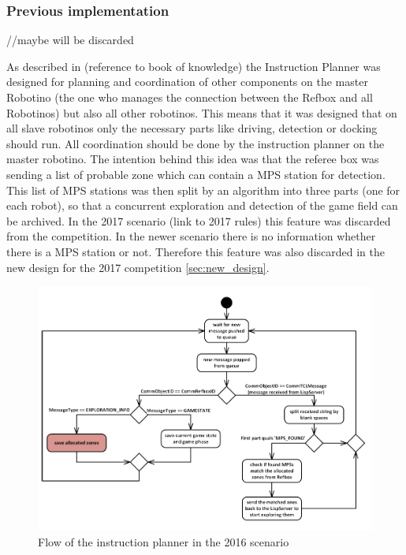 \subsubsection{Previous implementation}
\label{sec:previous}

//maybe will be discarded

As described in (reference to book of knowledge) the Instruction Planner was designed for planning and coordination of other components on the master Robotino (the one who manages the connection between the Refbox and all Robotinos) but also all other robotinos. This means that it was designed that on all slave robotinos only the necessary parts like driving, detection or docking should run. All coordination should be done by the instruction planner on the master robotino. The intention behind this idea was that the referee box was sending a list of probable zone which can contain a MPS station for detection. This list of MPS stations was then split by an algorithm into three parts (one for each robot), so that a concurrent exploration and detection of the game field can be archived. In the 2017 scenario (link to 2017 rules) this feature was discarded from the competition. In the newer scenario there is no information whether there is a MPS station or not. Therefore this feature was also discarded in the new design for the 2017 competition \ref{sec:new_design}.  \\



\begin{figure}[h]
\centering
\includegraphics[scale=0.5]{pic/2016_flow_graph.png}
\caption{Flow of the instruction planner in the 2016 scenario}
\label{fig:ip2016}

\end{figure}


